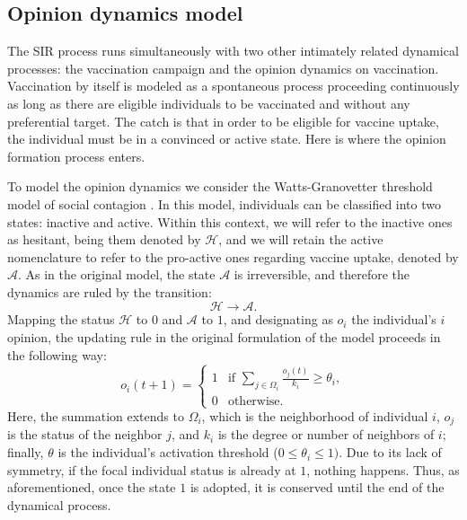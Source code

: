 \documentclass[
 reprint,
 amsmath,amssymb,
 aps,
]{revtex4-2}
\begin{document}
\subsection{Opinion dynamics model}
\label{subsec:opinion}

The SIR process runs simultaneously with two other intimately related dynamical processes: the vaccination campaign and the opinion dynamics on vaccination. Vaccination by itself is modeled as a spontaneous process proceeding continuously as long as there are eligible individuals to be vaccinated and without any preferential target. The catch is that in order to be eligible for vaccine uptake, the individual must be in a convinced or active state. Here is where the opinion formation process enters. 

To model the opinion dynamics we consider the Watts-Granovetter threshold model of social contagion \cite{granovetter1978threshold, watts2007influentials}. In this model, individuals can be classified into two states: inactive and active. Within this context, we will refer to the inactive ones as hesitant, being them denoted by $\mathcal{H}$, and we will retain the active nomenclature to refer to the pro-active ones regarding vaccine uptake, denoted by $\mathcal{A}$. As in the original model, the state $\mathcal{A}$ is irreversible, and therefore the dynamics are ruled by the transition:
\begin{equation}
    \mathcal{H}\xrightarrow{}\mathcal{A}.
\end{equation}
Mapping the status $\mathcal{H}$ to $0$ and $\mathcal{A}$ to $1$, and designating  as $o_i$ the individual's $i$ opinion, the updating rule in the original formulation of the model proceeds in the following way:
\begin{equation}
o_i(t+1)=
    \begin{cases}
        1 & \text{if } \sum_{j\in\Omega_i}\frac{o_j(t)}{k_i}\geq\theta_i,\\
        0 & \text{otherwise}.
    \end{cases}
\label{eq:watts}
\end{equation}
Here, the summation extends to $\Omega_i$, which is the neighborhood of individual $i$, $o_j$ is the status of the neighbor $j$, and $k_i$ is the degree or number of neighbors of $i$; finally, $\theta$ is the individual's activation threshold ($0\leq\theta_i\leq 1)$. Due to its lack of symmetry, if the focal individual status is already at $1$, nothing happens. Thus, as aforementioned, once the state $1$ is adopted, it is conserved until the end of the dynamical process.
\end{document}
